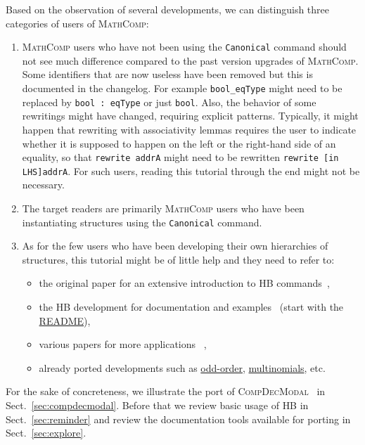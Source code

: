 \documentclass{article}
\def\mathcomp{\textsc{MathComp}}
\def\hb{\textsc{HB}}
\def\compdecmodal{\textsc{CompDecModal}}
\def\coqin#1{\texttt{#1}}
\begin{document}
Based on the observation of several developments, we can distinguish
three categories of users of \mathcomp:
\begin{enumerate}
\item \mathcomp{} users who have not been using the \coqin{Canonical}
  command should not see much difference compared to the past version
  upgrades of \mathcomp{}.
  Some identifiers that are now useless have been removed but this is
  documented in the changelog. For example \coqin{bool_eqType} might
  need to be replaced by \coqin{bool : eqType} or just \coqin{bool}.
  Also, the behavior of some rewritings might have changed, requiring
  explicit patterns. Typically, it might happen that rewriting with
  associativity lemmas requires the user to indicate whether it is
  supposed to happen on the left or the right-hand side of an
  equality, so that \coqin{rewrite addrA} might need to be rewritten
  \coqin{rewrite [in LHS]addrA}.
  For such users, reading this tutorial through the end might not be
  necessary.
\item The target readers are primarily \mathcomp{} users who have been
  instantiating structures using the \coqin{Canonical} command.
\item As for the few users who have been developing their own
  hierarchies of structures, this tutorial might be of little help and
  they need to refer to:
  \begin{itemize}
  \item the original paper for an extensive introduction to \hb{} commands~\cite{cohen2020fscd},
  \item the \hb{} development for documentation and examples~\cite{hb}
    (start with the \href{https://github.com/math-comp/hierarchy-builder#readme}{README}),
  \item various papers for more applications~\cite{mathcomp2021coq}
    \cite[Sect.~3]{affeldt2022arxiv} \cite[Sect.~4]{affeldt2023cpp},
  \item already ported developments such as
    \href{https://github.com/math-comp/odd-order}{odd-order},
    \href{https://github.com/math-comp/multinomials}{multinomials}, etc.
  \end{itemize}
\end{enumerate}

For the sake of concreteness, we illustrate the port of
\compdecmodal~\cite{compdecmodal} in Sect.~\ref{sec:compdecmodal}.
Before that we review basic usage of \hb{} in Sect.~\ref{sec:reminder}
and review the documentation tools available for porting in Sect.~\ref{sec:explore}.
\end{document}
